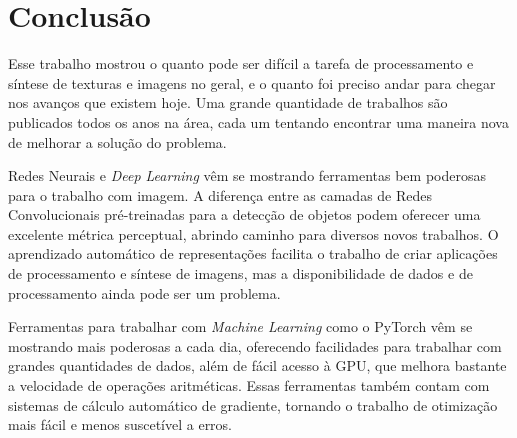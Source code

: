 \chapter{Conclusão}

Esse trabalho mostrou o quanto
pode ser difícil a tarefa de
processamento e síntese
de texturas e imagens no geral,
e o quanto foi preciso andar
para chegar nos avanços que
existem hoje.
Uma grande quantidade de trabalhos
são publicados todos os anos
na área, cada um tentando
encontrar uma maneira nova de
melhorar a solução do problema.

Redes Neurais e \textit{Deep Learning}
vêm se mostrando ferramentas
bem poderosas para o trabalho com imagem.
A diferença entre as camadas de
Redes Convolucionais pré-treinadas
para a detecção de objetos
podem oferecer uma excelente
métrica perceptual, abrindo caminho para
diversos novos trabalhos.
O aprendizado automático
de representações facilita
o trabalho de criar aplicações
de processamento e síntese de imagens,
mas a disponibilidade de dados
e de processamento ainda pode ser
um problema.



Ferramentas para trabalhar
com \textit{Machine Learning} como o
PyTorch vêm se mostrando
mais poderosas
a cada dia, oferecendo
facilidades para trabalhar 
com grandes quantidades de dados,
além de fácil acesso à GPU,
que melhora bastante a velocidade
de operações aritméticas.
Essas ferramentas também 
contam com sistemas de cálculo automático
de gradiente, tornando o trabalho
de otimização mais fácil e
menos suscetível a erros.






